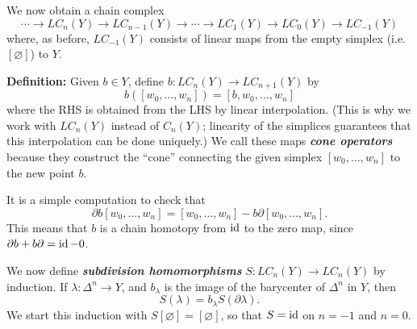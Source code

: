 \documentclass{article}
\begin{document}
We now obtain a chain complex%
\noindent\noindent\[%
\cdots \longrightarrow LC_n(Y)
\longrightarrow LC_{n-1}(Y)
\longrightarrow \cdots
\longrightarrow LC_{1}(Y)
\longrightarrow LC_{0}(Y)
\longrightarrow LC_{-1}(Y)
\]%
\noindent{}where, as before, $LC_{-1}(Y)$ consists of linear maps from the empty simplex (i.e. $[\varnothing]$) to $Y$.

\textbf{Definition:} Given $b \in Y$, define $b: LC_n(Y) \to LC_{n+1}(Y)$ by%
\noindent\noindent\[%
b([w_0, \dots, w_n]) = [b, w_0, \dots, w_n]
\]%
\noindent{}where the RHS is obtained from the LHS by linear interpolation. (This is why we work with $LC_n(Y)$ instead of $C_n(Y)$; linearity of the simplices guarantees that this interpolation can be done uniquely.) We call these maps \textbf{\emph{cone operators}} because they construct the \textquotedblleft{}cone\textquotedblright{} connecting the given simplex $[w_0, \dots, w_n]$ to the new point $b$.

It is a simple computation to check that%
\noindent\noindent\[%
\partial b [w_0, \dots, w_n] = [w_0, \dots, w_n] - b \partial [w_0, \dots, w_n].
\]%
\noindent{}This means that $b$ is a chain homotopy from $\operatorname{id}$ to the zero map, since $\partial b + b \partial = \operatorname{id} - 0$.

We now define \textbf{\emph{subdivision homomorphisms}} $S: LC_n(Y) \to LC_n(Y)$ by induction. If $\lambda: \Delta^n \to Y$, and $b_\lambda$ is the image of the barycenter of $\Delta^n$ in $Y$, then%
\noindent\noindent\[%
S(\lambda) = b_\lambda S(\partial \lambda).
\]%
\noindent{}We start this induction with $S[\varnothing] = [\varnothing]$, so that $S = \operatorname{id}$ on $n=-1$ and $n=0$.
\end{document}

